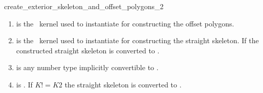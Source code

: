 \begin{ccRefFunction}{create_exterior_skeleton_and_offset_polygons_2}
\ccRequirements

\begin{enumerate}  
   \item    {} is the \cgal\ kernel used to instantiate
                             for constructing 
                            the offset polygons.
   \item    {} is the \cgal\ kernel used to instantiate
                             for constructing 
                            the straight skeleton.
                            If  the constructed straight skeleton
                            is converted to .
   \item    {} is any number type implicitly convertible to .
   \item    {} is . 
            If $K != K2$ the straight skeleton is converted to .
\end{enumerate}

\ccSeeAlso
{}\\
 \\

\end{ccRefFunction}



